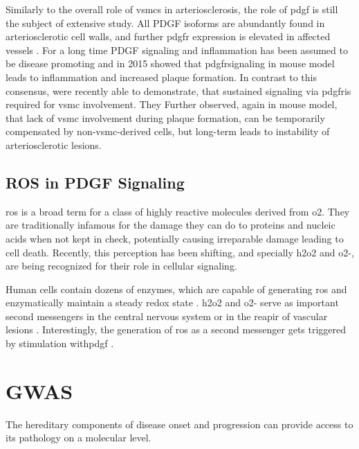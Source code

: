     Similarly to the overall role of \acp{vsmc} in arteriosclerosis, the role of \ac{pdgf} is still the subject of extensive study. All PDGF isoforms are abundantly found in arteriosclerotic cell walls, and further \ac{pdgfr} expression is elevated in affected vessels \cite{huTargetingPlateletderivedGrowth2015}. For a long time PDGF signaling and inflammation has been assumed to be disease promoting \cite{andraeRolePlateletderivedGrowth2008, chenPlateletderivedGrowthFactors2013, hePDGFRvSignallingRegulates2015, huTargetingPlateletderivedGrowth2015} and in 2015 \textcite{hePDGFRvSignallingRegulates2015} showed that \ac{pdgfr}\beta signaling in mouse model leads to inflammation and increased plaque formation. In contrast to this consensus, \textcite{newmanMultipleCellTypes2021} were recently able to demonstrate, that sustained signaling via \ac{pdgfr}\beta is required for \ac{vsmc} involvement. They Further observed, again in mouse model, that lack of \ac{vsmc} involvement during plaque formation, can be temporarily compensated by non-\ac{vsmc}-derived cells, but long-term leads to instability of arteriosclerotic lesions.

    \subsection{ROS in PDGF Signaling}
    \label{subsec:ROS_signaling}
    \ac{ros} is a broad term for a class of highly reactive molecules derived from \ac{o2}. They are traditionally infamous for the damage they can do to proteins and nucleic acids when not kept in check, potentially causing irreparable damage leading to cell death. Recently, this perception has been shifting, and specially \ac{h2o2} and \ac{o2-}, are being recognized for their role in cellular signaling. \cite{siesReactiveOxygenSpecies2020}

    Human cells contain dozens of enzymes, which are capable of generating \ac{ros} and enzymatically maintain a steady redox state \cite{siesReactiveOxygenSpecies2020}. \ac{h2o2} and \ac{o2-} serve as important second messengers in the central nervous system \cite{nayerniaNewInsightsNOX2014} or in the reapir of vascular lesions \cite{andraeRolePlateletderivedGrowth2008}. Interestingly, the generation of \ac{ros} as a second messenger gets triggered by stimulation with\ac{pdgf} \cite{sundaresanRequirementGenerationH2O21995, bouziguesRegulationROSResponse2014a}.


    \section{GWAS}
    \label{sec:gwas}
    The hereditary components of disease onset and progression can provide access to its pathology on a molecular level.

